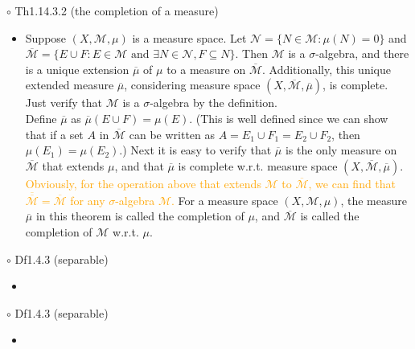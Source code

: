 \documentclass{article}
\begin{document}
{\Large $\circ $ Th1.14.3.2 (the completion of a measure)}\par
\begin{itemize}
    \item[]
    {\large Suppose $(X, \mathcal{M}, \mu)$ is a measure space. Let $\mathcal{N}=\{N\in \mathcal{M}: \mu(N)=0\}$ and 
    $\overline{\mathcal{M}}=\{E\cup F: E\in\mathcal{M} \text{ and } \exists N\in \mathcal{N}, F\subseteq N\}$. Then
    $\mathcal{M}$ is a $\sigma$-algebra, and there is a unique extension $\overline{\mu}$ of $\mu$ to a measure on
    $\overline{\mathcal{M}}$. Additionally, this unique extended measure $\overline{\mu}$, considering measure space
    $(X, \overline{\mathcal{M}}, \overline{\mu})$, is complete.}\\
    {\textcolor{pf}{Just verify that $\mathcal{M}$ is a $\sigma$-algebra by the definition.\\
    Define $\overline{\mu}$ as $\overline{\mu}(E\cup F)=\mu(E)$. (This is well defined since we can show that if a set
    $A$ in $\overline{\mathcal{M}}$ can be written as $A=E_1\cup F_1=E_2\cup F_2$, then $\mu(E_1)=\mu(E_2)$.) Next it is
    easy to verify that $\overline{\mu}$ is the only measure on $\overline{\mathcal{M}}$ that extends $\mu$, and that
    $\overline{\mu}$ is complete w.r.t. measure space $(X, \overline{\mathcal{M}}, \overline{\mu})$.}}\\
    \textcolor{orange}{Obviously, for the operation above that extends $\mathcal{M}$ to $\overline{\mathcal{M}}$, we can find
    that $\overline{\overline{\mathcal{M}}}=\overline{\mathcal{M}}$ for any $\sigma$-algebra $\mathcal{M}$.}
    {For a measure space $(X, \mathcal{M}, \mu)$, the measure $\overline{\mu}$ in this theorem is called the completion
    of $\mu$, and $\overline{\mathcal{M}}$ is called the completion of $\mathcal{M}$ w.r.t. $\mu$.}
\end{itemize}\par
\quad

{\Large $\circ $ Df1.4.3 (separable)}\par
\begin{itemize}
    \item[]
    {\large }
    {\textcolor{pf}{}}
\end{itemize}\par
\quad

{\Large $\circ $ Df1.4.3 (separable)}\par
\begin{itemize}
    \item[]
    {\large }
    {\textcolor{pf}{}}
\end{itemize}\par
\quad
\end{document}
